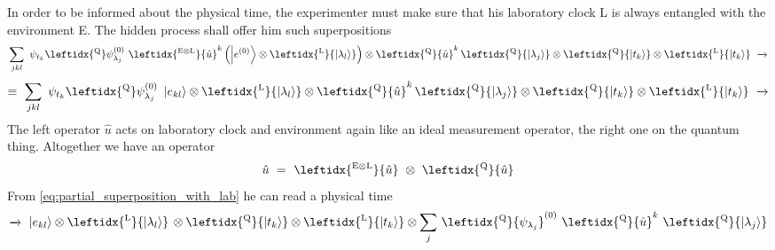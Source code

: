 \documentclass[12pt]{article}
\begin{document}
In order to be informed about the physical time, the experimenter must make sure that his laboratory clock L is always entangled with the environment E. The hidden process shall offer him such superpositions
\begin{equation*}
\sum_{jkl} \ \psi_{t_k} \leftidx{^\mathrm{Q}}\psi_{\lambda_j}^{(0)}\ 
\leftidx{^\mathrm{E \otimes L}}{\hat{u}}^k \left( \ket{e^{(0)}} \otimes \leftidx{^\mathrm{L}}{\ket{\lambda_l}} \right) 
\otimes \leftidx{^\mathrm{Q}}{\hat{u}}^{k}\, \leftidx{^\mathrm{Q}}{\ket{\lambda_j}}
\otimes \leftidx{^\mathrm{Q}}{\ket{t_k}}
\otimes \leftidx{^\mathrm{L}}{\ket{t_k}}
\ \xrightarrow{}
\end{equation*}
\begin{equation}
\label{eq:partial_superposition_with_lab}
\equiv\ \sum_{jkl} \ \psi_{t_k} \leftidx{^\mathrm{Q}}\psi_{\lambda_j}^{(0)}\ 
\ket{e_{kl}} 
\otimes \leftidx{^\mathrm{L}}{\ket{\lambda_l}} 
\otimes \leftidx{^\mathrm{Q}}{\hat{u}}^{k}\, \leftidx{^\mathrm{Q}}{\ket{\lambda_j}}
\otimes \leftidx{^\mathrm{Q}}{\ket{t_k}}
\otimes \leftidx{^\mathrm{L}}{\ket{t_k}}
\ \xrightarrow{}
\end{equation}
The left operator $\hat{u}$ acts on laboratory clock and environment again like an ideal measurement operator, the right one on the quantum thing. Altogether we have an operator
\begin{equation}
\label{eq:unitary_2_parts}
\hat{u}\ =\ \leftidx{^\mathrm{E \otimes L}}{\hat{u}}\ \otimes\ \leftidx{^\mathrm{Q}}{\hat{u}}
\end{equation}
From \eqref{eq:partial_superposition_with_lab} he can read a physical time
\begin{equation*}
\xrightarrow{} \ \ket{e_{kl}} 
\otimes \leftidx{^\mathrm{L}}{\ket{\lambda_l}} \,
\otimes \leftidx{^\mathrm{Q}}{\ket{t_k}}
\otimes \leftidx{^\mathrm{L}}{\ket{t_k}}
\otimes \sum_{j} \, \leftidx{^\mathrm{Q}}{\psi_{\lambda_j}}^{(0)}\ 
\leftidx{^\mathrm{Q}}{\hat{u}}^{k}\ 
\leftidx{^\mathrm{Q}}{\ket{\lambda_j}}
\end{equation*}
\end{document}
